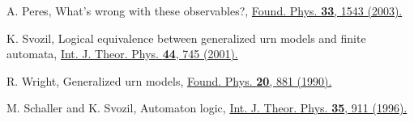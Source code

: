 \documentclass[%
 twocolumn,
 groupedaddress,
 showpacs,
 showkeys,
 preprintnumbers,
 amsmath,amssymb,
 aps,
 pra,
 longbibliography,
 floatfix,
 ]{revtex4-1}
\begin{document}
\begin{thebibliography}{99}
 A. Peres,
 What's wrong with these observables?,
\href{https://doi.org/10.1023/A:1026000614638}{Found. Phys. \textbf{33}, 1543 (2003).}

K. Svozil,
Logical equivalence between generalized urn models and finite automata,
\href{http://doi.org/10.1007/s10773-005-7052-0}{Int. J. Theor. Phys. \textbf{44}, 745 (2001).}

R. Wright,
Generalized urn models,
\href{http://doi.org/10.1007/BF01889696}{Found. Phys. \textbf{20}, 881 (1990).}

M. Schaller and K. Svozil,
Automaton logic,
\href{http://doi.org/10.1007/BF02302381}{Int. J. Theor. Phys. \textbf{35}, 911 (1996).}


\end{thebibliography}

\end{document}

